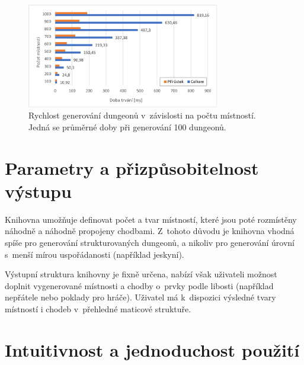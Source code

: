 \begin{figure}[ht]
    \centering
    \includegraphics[width=0.75\textwidth]{obrazky/graph_speed2.pdf}
    \caption{Rychlost generování dungeonů v~závislosti na počtu místností. Jedná se průměrné doby při generování 100 dungeonů.}
    \label{img:graph_speed2}
\end{figure}


\section{Parametry a přizpůsobitelnost výstupu}


Knihovna umožňuje definovat počet a tvar místností, které jsou poté rozmístěny náhodně a náhodně propojeny chodbami.
Z~tohoto důvodu je knihovna vhodná spíše pro generování strukturovaných dungeonů, a nikoliv pro generování úrovní s~menší mírou uspořádanosti (například jeskyní).
\par
Výstupní struktura knihovny je fixně určena, nabízí však uživateli možnost doplnit vygenerované místnosti a chodby o~prvky podle libosti (například nepřátele nebo poklady pro hráče).
Uživatel má k~dispozici výsledné tvary místností i chodeb v~přehledné maticové struktuře.


\section{Intuitivnost a jednoduchost použití}


